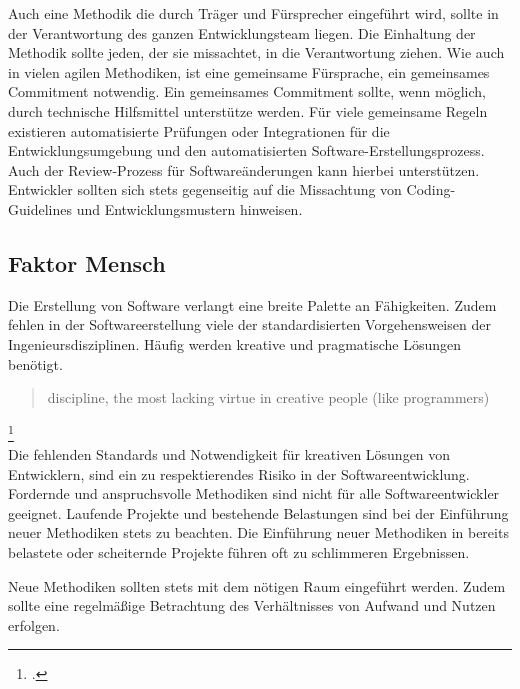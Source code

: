 Auch eine Methodik die durch Träger und Fürsprecher eingeführt wird, sollte in der Verantwortung des ganzen Entwicklungsteam liegen. Die Einhaltung der Methodik sollte jeden, der sie missachtet, in die Verantwortung ziehen.
Wie auch in vielen agilen Methodiken, ist eine gemeinsame Fürsprache, ein gemeinsames \glqq Commitment\grqq{} notwendig. Ein gemeinsames Commitment sollte, wenn möglich, durch technische Hilfsmittel unterstütze werden. Für viele gemeinsame Regeln existieren automatisierte Prüfungen oder Integrationen für die Entwicklungsumgebung und den automatisierten Software-Erstellungsprozess.
Auch der Review-Prozess für Softwareänderungen kann hierbei unterstützen. Entwickler sollten sich stets gegenseitig auf die Missachtung von Coding-Guidelines und Entwicklungsmustern hinweisen.

\subsection{Faktor Mensch}

Die Erstellung von Software verlangt eine breite Palette an Fähigkeiten. Zudem fehlen in der Softwareerstellung viele der standardisierten Vorgehensweisen der Ingenieursdisziplinen. Häufig werden kreative und pragmatische Lösungen benötigt.

\blockquote {discipline, the most lacking virtue in creative people (like programmers)}\footcite[][S.167]{git-essentials-2017}
\vspace{1em}\\
Die fehlenden Standards und Notwendigkeit für kreativen Lösungen von Entwicklern, sind ein zu respektierendes Risiko in der Softwareentwicklung. Fordernde und anspruchsvolle Methodiken sind nicht für alle Softwareentwickler geeignet. Laufende Projekte und bestehende Belastungen sind bei der Einführung neuer Methodiken stets zu beachten. Die Einführung neuer Methodiken in bereits belastete oder scheiternde Projekte führen oft zu schlimmeren Ergebnissen.

Neue Methodiken sollten stets mit dem nötigen Raum eingeführt werden. Zudem sollte eine regelmäßige Betrachtung des Verhältnisses von Aufwand und Nutzen erfolgen.
